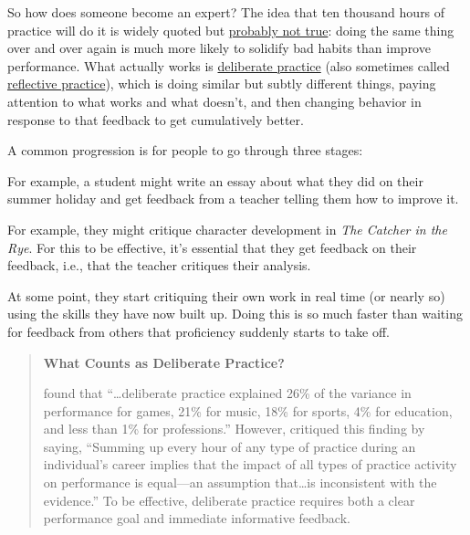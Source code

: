So how does someone become an expert? The idea that ten thousand hours
of practice will do it is widely quoted but \href{http://www.goodlifeproject.com/podcast/anders-ericsson/}{probably not
true}: doing the same thing over and over again is
much more likely to solidify bad habits than improve performance. What
actually works is \protect\hyperlink{g:deliberate-practice}{deliberate practice} (also
sometimes called \protect\hyperlink{g:reflective-practice}{reflective practice}), which
is doing similar but subtly different things, paying attention to what
works and what doesn't, and then changing behavior in response to that
feedback to get cumulatively better.

A common progression is for people to go through three stages:

\begin{description}
\tightlist
\item[Act on feedback from others.]
For example, a student might write an essay about what they did on
their summer holiday and get feedback from a teacher telling them
how to improve it.
\item[Give feedback to others.]
For example, they might critique character development in \emph{The
Catcher in the Rye}. For this to be effective, it's essential that
they get feedback on their feedback, i.e., that the teacher critiques
their analysis.
\item[Give feedback to themselves.]
At some point, they start critiquing their own work in real time (or
nearly so) using the skills they have now built up. Doing this is so
much faster than waiting for feedback from others that proficiency
suddenly starts to take off.
\end{description}

\begin{quote}\setlength{\parindent}{0pt}
\textbf{What Counts as Deliberate Practice?}

\cite{Macn2014} found that ``\ldots{}deliberate practice
explained 26\% of the variance in performance for games, 21\% for music,
18\% for sports, 4\% for education, and less than 1\% for professions.''
However, \cite{Eric2016} critiqued this finding by saying, ``Summing
up every hour of any type of practice during an individual's career
implies that the impact of all types of practice activity on
performance is equal---an assumption that\ldots{}is inconsistent
with the evidence.'' To be effective, deliberate practice requires both
a clear performance goal and immediate informative feedback.
\end{quote}

